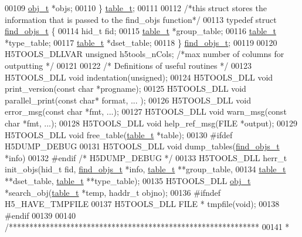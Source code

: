 \begin{DoxyCode}
00109     \hyperlink{structobj__t}{obj\_t} *objs;
00110 \} \hyperlink{structtable__t}{table\_t};
00111 
00112 \textcolor{comment}{/*this struct stores the information that is passed to the find\_objs function*/}
00113 \textcolor{keyword}{typedef} \textcolor{keyword}{struct }\hyperlink{structfind__objs__t}{find\_objs\_t} \{
00114     hid\_t fid;
00115     \hyperlink{structtable__t}{table\_t} *group\_table;
00116     \hyperlink{structtable__t}{table\_t} *type\_table;
00117     \hyperlink{structtable__t}{table\_t} *dset\_table;
00118 \} \hyperlink{structfind__objs__t}{find\_objs\_t};
00119 
00120 H5TOOLS\_DLLVAR \textcolor{keywordtype}{unsigned} h5tools\_nCols;               \textcolor{comment}{/*max number of columns for outputting  */}
00121 
00122 \textcolor{comment}{/* Definitions of useful routines */}
00123 H5TOOLS\_DLL \textcolor{keywordtype}{void}     indentation(\textcolor{keywordtype}{unsigned});
00124 H5TOOLS\_DLL \textcolor{keywordtype}{void}     print\_version(\textcolor{keyword}{const} \textcolor{keywordtype}{char} *progname);
00125 H5TOOLS\_DLL \textcolor{keywordtype}{void}     parallel\_print(\textcolor{keyword}{const} \textcolor{keywordtype}{char}* format, ... );
00126 H5TOOLS\_DLL \textcolor{keywordtype}{void}     error\_msg(\textcolor{keyword}{const} \textcolor{keywordtype}{char} *fmt, ...);
00127 H5TOOLS\_DLL \textcolor{keywordtype}{void}     warn\_msg(\textcolor{keyword}{const} \textcolor{keywordtype}{char} *fmt, ...);
00128 H5TOOLS\_DLL \textcolor{keywordtype}{void}     help\_ref\_msg(FILE *output);
00129 H5TOOLS\_DLL \textcolor{keywordtype}{void}     free\_table(\hyperlink{structtable__t}{table\_t} *table);
00130 \textcolor{preprocessor}{#ifdef H5DUMP\_DEBUG}
00131 H5TOOLS\_DLL \textcolor{keywordtype}{void}     dump\_tables(\hyperlink{structfind__objs__t}{find\_objs\_t} *info)
00132 \textcolor{preprocessor}{#endif  }\textcolor{comment}{/* H5DUMP\_DEBUG */}\textcolor{preprocessor}{}
00133 H5TOOLS\_DLL herr\_t init\_objs(hid\_t fid, \hyperlink{structfind__objs__t}{find\_objs\_t} *info, \hyperlink{structtable__t}{table\_t} **group\_table,
00134     \hyperlink{structtable__t}{table\_t} **dset\_table, \hyperlink{structtable__t}{table\_t} **type\_table);
00135 H5TOOLS\_DLL \hyperlink{structobj__t}{obj\_t}   *search\_obj(\hyperlink{structtable__t}{table\_t} *temp, haddr\_t objno);
00136 \textcolor{preprocessor}{#ifndef H5\_HAVE\_TMPFILE}
00137 H5TOOLS\_DLL FILE *  tmpfile(\textcolor{keywordtype}{void});
00138 \textcolor{preprocessor}{#endif}
00139 
00140 \textcolor{comment}{/*************************************************************}
00141 \textcolor{comment}{ *}

\end{DoxyCode}
